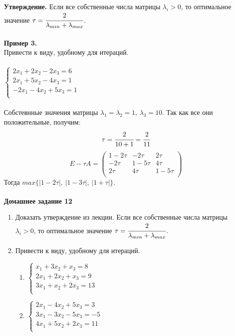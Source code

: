 \documentclass[12pt]{article}
\theoremstyle{definition}
\numberwithin{equation}{section}
\begin{document}
\textbf{Утверждение.} Если все собственные числа матрицы $\lambda_i>0$, то оптимальное значение $\tau=\cfrac{2}{\lambda_{min}+\lambda_{max}}$.\\ \\
\newpage
\noindent\textbf{Пример 3.}\\
Привести к виду, удобному для итераций.\\ \\
$
\left\{
\begin{array}{lcl}
    2x_1+2x_2-2x_3=6\\
    2x_1+5x_2-4x_3=1\\
    -2x_1-4x_2+5x_3=1\\
\end{array}
\right.
$
\\ \\
Собстевнные значения матрицы $\lambda_1=\lambda_2=1,~\lambda_3=10$. Так как все они положительные, получим: 
$$\tau=\cfrac{2}{10+1}=\cfrac{2}{11}$$
\[E-\tau A=\begin{pmatrix}
1-2\tau & -2\tau & 2\tau \\
-2\tau & 1-5\tau & 4\tau \\
2\tau & 4\tau & 1-5\tau \\
\end{pmatrix}\]
Тогда $max\{|1-2\tau|,~|1-3\tau|,~|1+\tau|\}$.\\
~\\
\textbf{Домашнее задание 12}\begin{enumerate}
\item Доказать утверждение из лекции. Если все собственные числа матрицы $\lambda_i>0$, то оптимальное значение $\tau=\cfrac{2}{\lambda_{min}+\lambda_{max}}$.
\item Привести к виду, удобному для итераций.
\begin{enumerate}
    \item $
\left\{
\begin{array}{lcl}
    x_1+3x_2+x_3=8\\
    2x_1+2x_2+x_3=9\\
    3x_1+x_2+2x_3=13\\
\end{array}
\right.
$
    \item $
\left\{
\begin{array}{lcl}
    2x_1-4x_2+5x_3=3\\
    3x_1-3x_2-5x_3=-5\\
    4x_1+5x_2+2x_3=11\\
\end{array}
\right.
$
\end{enumerate}
\end{enumerate}
~\\
\end{document}
